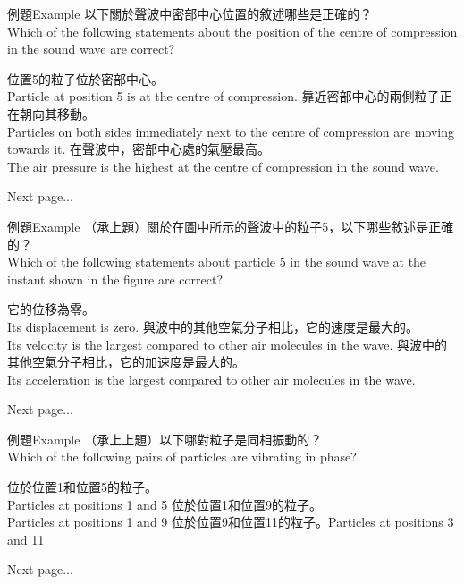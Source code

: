 \documentclass[beamer=true]{standalone}
\begin{document}
\begin{frame}[t]{例題Example}
    以下關於聲波中密部中心位置的敘述哪些是正確的？\\Which of the following statements about the position of the centre of compression in the sound wave are correct?
    \begin{statements}
        \task 位置5的粒子位於密部中心。\\Particle at position 5 is at the centre of compression.
        \task 靠近密部中心的兩側粒子正在朝向其移動。\\Particles on both sides immediately next to the centre of compression are moving towards it.
        \task 在聲波中，密部中心處的氣壓最高。\\The air pressure is the highest at the centre of compression in the sound wave.
    \end{statements}
    \vfill\raggedleft Next page...
\end{frame}

\begin{frame}[t]{例題Example}
    （承上題）關於在圖中所示的聲波中的粒子5，以下哪些敘述是正確的？\\Which of the following statements about particle 5 in the sound wave at the instant shown in the figure are correct?
    \begin{statements}
        \task 它的位移為零。\\Its displacement is zero.
        \task 與波中的其他空氣分子相比，它的速度是最大的。\\Its velocity is the largest compared to other air molecules in the wave.
        \task 與波中的其他空氣分子相比，它的加速度是最大的。\\Its acceleration is the largest compared to other air molecules in the wave.
    \end{statements}
    \vfill\raggedleft Next page...
\end{frame}

\begin{frame}[t]{例題Example}
    （承上上題）以下哪對粒子是同相振動的？\\Which of the following pairs of particles are vibrating in phase?
    \begin{statements}
        \task 位於位置1和位置5的粒子。\\Particles at positions 1 and 5
        \task 位於位置1和位置9的粒子。\\Particles at positions 1 and 9
        \task 位於位置9和位置11的粒子。Particles at positions 3 and 11
    \end{statements}

    \vfill\raggedleft Next page...
\end{frame}
\end{document}
